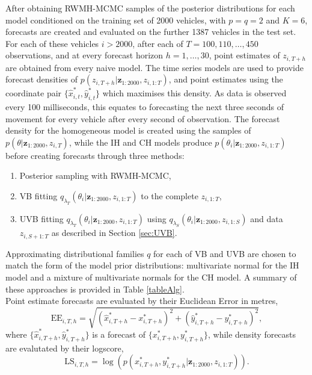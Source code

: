 \documentclass[12pt,a4paper]{article}\usepackage[]{graphicx}\usepackage[]{color}
\begin{document}
After obtaining RWMH-MCMC samples of the posterior distributions for each model conditioned on the training set of 2000 vehicles, with $p = q = 2$ and $K = 6$, forecasts are created and evaluated on the  further 1387 vehicles in the test set. For each of these vehicles $i > 2000$, after each of $T = 100, 110, \dots, 450$ observations, and at every forecast horizon $h = 1, \dots, 30$, point estimates of $z_{i, T+h}$ are obtained from every naive model. The time series models are used to provide forecast densities of $p(z_{i, T+h} | \textbf{z}_{1:2000}, z_{i, 1:T})$, and point estimates using the coordinate pair $\{\hat{x}_{i, t}^*, \hat{y}_{i, t}^*\}$ which maximises this density. As data is observed every 100 milliseconds, this equates to forecasting the next three seconds of movement for every vehicle after every second of observation. The forecast density for the homogeneous model is created using the samples of $p(\theta | \textbf{z}_{1:2000}, z_{i, T})$, while the IH and CH models produce $p(\theta_{i} | \textbf{z}_{1:2000}, z_{i, 1:T})$ before creating forecasts through three methods:
\begin{enumerate}
\item Posterior sampling with RWMH-MCMC,
\item VB fitting $q_{\lambda_T}(\theta_{i} | \textbf{z}_{1:2000}, z_{i, 1:T})$ to the complete $z_{i, 1:T}$,
\item UVB fitting $q_{\lambda_T}(\theta_{i} | \textbf{z}_{1:2000}, z_{i, 1:T})$ using $q_{\lambda_S}(\theta_{i} | \textbf{z}_{1:2000}, z_{i, 1:S})$ and data $z_{i, S+1:T}$ as described in Section \ref{sec:UVB}.
\end{enumerate}

Approximating distributional families $q$ for each of VB and UVB are chosen to match the form of the model prior distributions: multivariate normal for the IH model and a mixture of multivariate normals for the CH model. A summary of these approaches is provided in Table \ref{tableAlg}. 
\\

Point estimate forecasts are evaluated by their Euclidean Error in metres,
\begin{equation}
\mbox{EE}_{i, T, h} = \sqrt{\left(\hat{x}^*_{i, T+h} - x^*_{i, T+h} \right)^2 + \left(\hat{y}^*_{i, T+h} - y^*_{i, T+h} \right)^2},
\label{eucError}
\end{equation}
where $\{\hat{x}^*_{i, T+h}, \hat{y}^*_{i, T+h}\}$ is a forecast of $\{x^*_{i, T+h}, y^*_{i, T+h}\}$, while density forecasts are evalutated by their logscore,
\begin{equation}
\mbox{LS}_{i, T, h} = \log \left(p\left(x^*_{i, T+h}, y^*_{i, T+h} | \textbf{z}_{1:2000}, z_{i, 1:T} \right) \right).
\label{logscore}
\end{equation}
\end{document}
